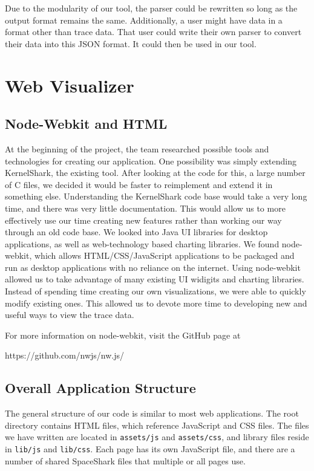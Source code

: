 \documentclass{hmcclinic}
\begin{document}
  Due to the modularity of our tool, the parser could be rewritten so long as
  the output format remains the same. Additionally, a user might have data
  in a format other than trace data. That user could write their own parser to
  convert their data into this JSON format. It could then be used in our tool.

  \section{Web Visualizer}

  
  \subsection{Node-Webkit and HTML} %
    At the beginning of the project, the team researched possible tools and
    technologies for creating our application. One possibility was simply
    extending KernelShark, the existing tool. After looking at the code for
    this, a large number of C files, we decided it would be faster to
    reimplement and extend it in something else. Understanding the KernelShark code base
    would take a very long time, and there was very little documentation. This
    would allow us to more effectively use our time creating new features rather
    than working our way through an old code base. We
    looked into Java UI libraries for desktop applications, as well as
    web-technology based charting libraries.  We found node-webkit, which allows
    HTML/CSS/JavaScript applications to be packaged and run as desktop
    applications with no reliance on the internet. 
    Using node-webkit allowed us to take advantage of many existing UI widigits
    and charting libraries. Instead of spending time creating our own
    visualizations, we were able to quickly modify existing ones. This allowed
    us to devote more time to developing new and useful ways to view the trace
    data.

For more information on node-webkit, visit the GitHub page at 
\begin{center}https://github.com/nwjs/nw.js/\end{center}

  \subsection{Overall Application Structure}

  The general structure of our code is similar to most web applications. 
  The root directory contains HTML files, which reference JavaScript and CSS files. The files
  we have written are located in \texttt{assets/js} and \texttt{assets/css}, and
  library files reside in \texttt{lib/js} and \texttt{lib/css}.  Each page has
  its own JavaScript file, and there are a number of shared SpaceShark files that
  multiple or all pages use.
  
\end{document}

